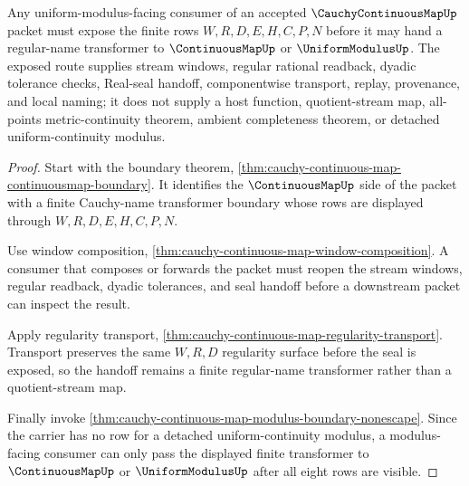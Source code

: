 \begin{theorem}
\label{thm:cauchy-continuous-map-uniform-window-obligation}
Any uniform-modulus-facing consumer of an accepted $\CauchyContinuousMapUp$ packet must expose the finite rows $W,R,D,E,H,C,P,N$ before it may hand a regular-name transformer to $\ContinuousMapUp$ or $\UniformModulusUp$. The exposed route supplies stream windows, regular rational readback, dyadic tolerance checks, Real-seal handoff, componentwise transport, replay, provenance, and local naming; it does not supply a host function, quotient-stream map, all-points metric-continuity theorem, ambient completeness theorem, or detached uniform-continuity modulus.
\end{theorem}
\begin{proof}
Start with the boundary theorem, \autoref{thm:cauchy-continuous-map-continuousmap-boundary}. It identifies the $\ContinuousMapUp$ side of the packet with a finite Cauchy-name transformer boundary whose rows are displayed through $W,R,D,E,H,C,P,N$.

Use window composition, \autoref{thm:cauchy-continuous-map-window-composition}. A consumer that composes or forwards the packet must reopen the stream windows, regular readback, dyadic tolerances, and seal handoff before a downstream packet can inspect the result.

Apply regularity transport, \autoref{thm:cauchy-continuous-map-regularity-transport}. Transport preserves the same $W,R,D$ regularity surface before the seal is exposed, so the handoff remains a finite regular-name transformer rather than a quotient-stream map.

Finally invoke \autoref{thm:cauchy-continuous-map-modulus-boundary-nonescape}. Since the carrier has no row for a detached uniform-continuity modulus, a modulus-facing consumer can only pass the displayed finite transformer to $\ContinuousMapUp$ or $\UniformModulusUp$ after all eight rows are visible.
\end{proof}

